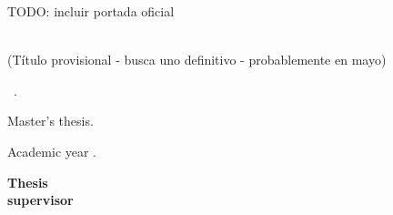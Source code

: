 

\thispagestyle{empty}

\begin{center}
  {\small TODO: incluir portada oficial}
  \large  


  \begingroup
  \huge{\miTitulo} \\
  {\small (Título provisional - busca uno definitivo - probablemente en mayo)}
  \bigskip
  
  \endgroup

  \textrm{\miNombre}


\end{center}  

\newpage
\thispagestyle{empty}

\hfill

\vfill

\miNombre\ \textit{\miTitulo}.

Master's thesis.

Academic year \miCurso.\\

\begin{minipage}[t]{0.25\textwidth}
  \flushleft
  \textbf{Thesis\\ supervisor}
\end{minipage}
\begin{minipage}[t]{0.40\textwidth}
  \flushleft
  \miTutor
\end{minipage}
\begin{minipage}[t]{0.35\textwidth}
  \flushright
  \miGrado
  \medskip

  \miUniversidad
\end{minipage}
\begin{flushleft}
\end{flushleft}

\endinput
